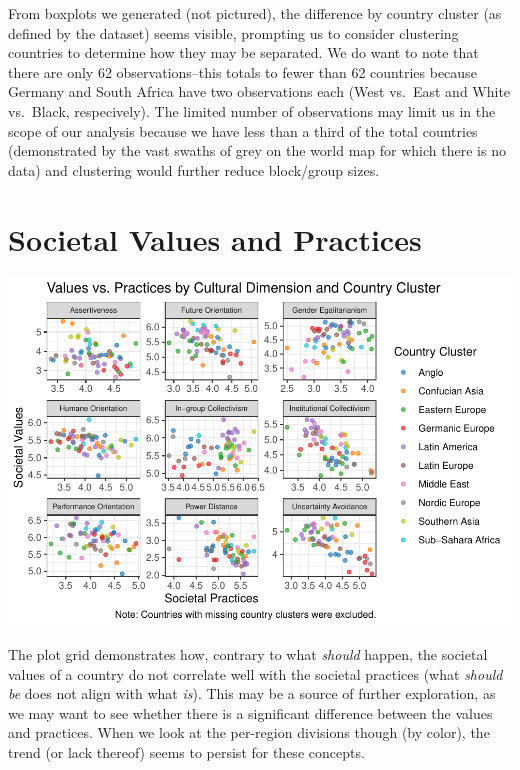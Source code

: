 \documentclass[
]{article}
\begin{document}
From boxplots we generated (not pictured), the difference by country
cluster (as defined by the dataset) seems visible, prompting us to
consider clustering countries to determine how they may be separated. We
do want to note that there are only 62 observations--this totals to
fewer than 62 countries because Germany and South Africa have two
observations each (West vs.~East and White vs.~Black, respecively). The
limited number of observations may limit us in the scope of our analysis
because we have less than a third of the total countries (demonstrated
by the vast swaths of grey on the world map for which there is no data)
and clustering would further reduce block/group sizes.

\hypertarget{societal-values-and-practices}{%
\section{Societal Values and
Practices}\label{societal-values-and-practices}}

\begin{center}\includegraphics{eda_files/figure-latex/society-1} \end{center}

The plot grid demonstrates how, contrary to what \emph{should} happen,
the societal values of a country do not correlate well with the societal
practices (what \emph{should be} does not align with what \emph{is}).
This may be a source of further exploration, as we may want to see
whether there is a significant difference between the values and
practices. When we look at the per-region divisions though (by color),
the trend (or lack thereof) seems to persist for these concepts.
\end{document}
